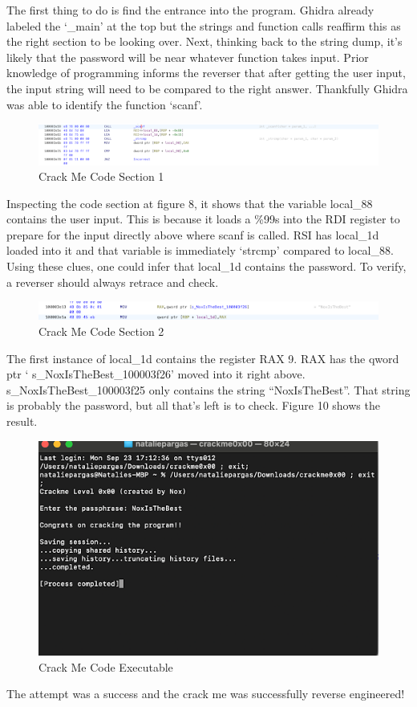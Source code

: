 The first thing to do is find the entrance into the program. 
Ghidra already labeled the ‘\_main’ at the top but the strings and function calls reaffirm this as the right section to be looking over. 
Next, thinking back to the string dump, it’s likely that the password will be near whatever function takes input. 
Prior knowledge of programming informs the reverser that after getting the user input, the input string will need to be compared to the right answer. 
Thankfully Ghidra was able to identify the function ‘scanf’.
  
\begin{figure}[h]
\caption{Crack Me Code Section 1}
\includegraphics{crackmescanf.png}
\end{figure}
  
Inspecting the code section at figure 8, it shows that the variable local\_88 contains the user input. 
This is because it loads a \%99s into the RDI register to prepare for the input directly above where scanf is called. 
RSI has local\_1d loaded into it and that variable is immediately ‘strcmp’ compared to local\_88. Using these clues, one could infer that local\_1d contains the password. 
To verify, a reverser should always retrace and check.
  
\begin{figure}[h]
\caption{Crack Me Code Section 2}
\includegraphics{crackmeRAX.png}
\end{figure}
  
The first instance of local\_1d contains the register RAX 9. 
RAX has the qword ptr ‘ s\_NoxIsTheBest\_100003f26’ moved into it right above. 
s\_NoxIsTheBest\_100003f25 only contains the string “NoxIsTheBest”. 
That string is probably the password, but all that’s left is to check. 
Figure 10 shows the result.
\clearpage
\begin{figure}[h!]
\caption{Crack Me Code Executable}
\includegraphics[]{crackmeexe.png}
\end{figure}
The attempt was a success and the crack me was successfully reverse engineered!
  

